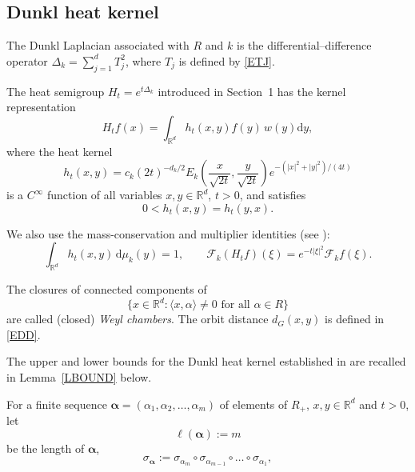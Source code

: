 \documentclass[12pt]{article}
\begin{document}
\subsection{Dunkl heat kernel}

The Dunkl Laplacian associated with $R$ and $k$ is the differential--difference operator
$\Delta_k=\sum_{j=1}^d T_j^2$, where $T_j$ is defined by \eqref{ETJ}.

The heat semigroup $H_t=e^{t\Delta_k}$ introduced in Section~1 has the kernel representation
\[
H_t f(x)=\int_{\mathbb{R}^d} h_t(x,y) f(y)\,w(y)\mathrm{d}y,
\]
where the heat kernel
\begin{equation}\label{eq:2.25}
h_t(x,y)=c_k(2t)^{-d_k/2} E_k\!\left(\frac{x}{\sqrt{2t}},\frac{y}{\sqrt{2t}}\right) e^{-(|x|^2+|y|^2)/(4t)}
\end{equation}
is a $C^\infty$ function of all variables $x,y\in\mathbb{R}^d$, $t>0$, and satisfies
\begin{equation}\label{eq:2.26}
0<h_t(x,y)=h_t(y,x).
\end{equation}

We also use the mass-conservation and multiplier identities (see \cite{MR2}):
\[
\int_{\mathbb{R}^d}h_t(x,y)\,\mathrm{d}\mu_k(y)=1,\qquad
\mathcal{F}_k(H_tf)(\xi)=e^{-t|\xi|^2}\mathcal{F}_k f(\xi).
\]

The closures of connected components of
\[
\{x\in\mathbb{R}^d:\langle x,\alpha\rangle\neq 0 \text{ for all } \alpha\in R\}
\]
are called (closed) \textit{Weyl chambers}. %
The orbit distance $d_G(x,y)$ is defined in \eqref{EDD}.

The upper and lower bounds for the Dunkl heat kernel established in \cite{JDA1} are recalled in Lemma~\ref{LBOUND} below.

For a finite sequence $\boldsymbol{\alpha}=(\alpha_1,\alpha_2,\dots,\alpha_m)$ of elements of $R_+$, $x,y\in\mathbb{R}^d$ and $t>0$, let
\begin{equation}\label{eq:1.3}
\ell(\boldsymbol{\alpha}):=m
\end{equation}
be the length of $\boldsymbol{\alpha}$,
\begin{equation}\label{eq:1.4}
\sigma_{\boldsymbol{\alpha}}:=\sigma_{\alpha_m}\circ\sigma_{\alpha_{m-1}}\circ\dots\circ\sigma_{\alpha_1},
\end{equation}
\end{document}
